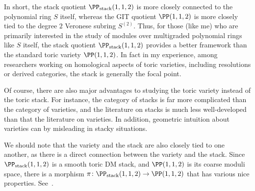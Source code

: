 In short, the stack quotient $\PP_{\text{stack}}(1,1,2)$ is more closely connected to the polynomial ring $S$ itself, whereas the GIT quotient $\PP(1,1,2)$ is more closely tied to the degree $2$ Veronese subring $S^{(2)}$.   Thus, for those (like me) who are primarily interested in the study of modules over multigraded polynomial rings like $S$ itself, the stack quotient $\PP_{\text{stack}}(1,1,2)$ provides a better framework than the standard toric variety $\PP(1,1,2)$.  In fact in my experience, among researchers working on homological aspects of toric varieties, including resolutions or derived categories, the stack is generally the focal point.


Of course, there are also major advantages to studying the toric variety instead of the toric stack.  For instance, the category of stacks is far more complicated than the category of varieties, and the literature on stacks is much less well-developed than that the literature on varieties.  In addition, geometric intuition about varieties can by misleading in stacky situations.
%


We should note that the variety and the stack are also closely tied to one another, as there is a direct connection between the variety and the stack.  Since $\PP_{\text{stack}}(1,1,2)$ is a smooth toric DM stack, and $\PP(1,1,2)$ is its coarse moduli space, there is  a morphism $\pi\colon \PP_{\text{stack}}(1,1,2) \to \PP(1,1,2)$ that has various nice properties.  See~\cite{BCS05}.

